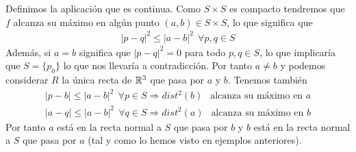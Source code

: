 \begin{ejercicio}
\begin{enumerate}
        Definimos la aplicación
        que es continua. Como $S\times S$ es compacto tendremos que $f$ alcanza su máximo en algún punto $(a,b)\in S\times S$, lo que significa que 
        \begin{gather*}
            |p-q|^2 \leq |a-b|^2 \ \ \forall p,q\in S
        \end{gather*}
        Además, si $a=b$ significa que $|p-q|^2 = 0$ para todo $p,q\in S$, lo que implicaría que $S=\{p_0\}$ lo que nos llevaría a contradicción. Por tanto $a\neq b$ y podemos considerar $R$ la única recta de $\mathbb{R}^3$ que pasa por $a$ y $b$. Tenemos también
        \begin{gather*}
            |p-b| \leq |a-b|^2 \ \ \forall p \in S \Rightarrow dist^2(b) \ \ \text{ alcanza su máximo en }a\\
            |a-q| \leq |a-b|^2 \ \ \forall q \in S \Rightarrow dist^2(a) \ \ \text{ alcanza su máximo en }b
        \end{gather*}
        Por tanto $a$ está en la recta normal a $S$ que pasa por $b$ y $b$ está en la recta normal a $S$ que pasa por $a$ (tal y como lo hemos visto en ejemplos anteriores).
    \end{enumerate}
\end{ejercicio}